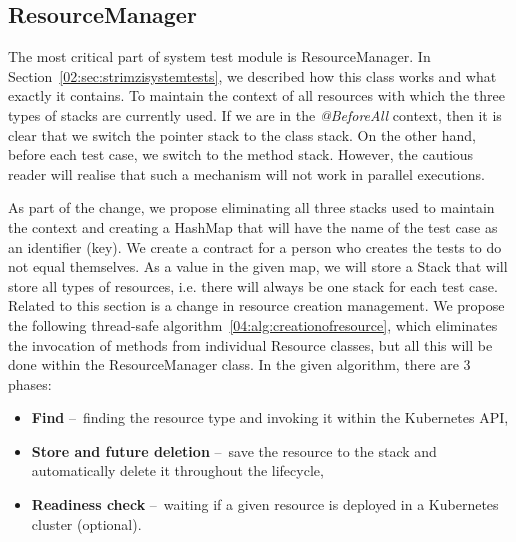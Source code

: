 \subsection{ResourceManager}
\label{04:sub:sec:resourcemanager}

The most critical part of system test module is ResourceManager.
In Section~\ref{02:sec:strimzisystemtests}, we described how this class works and what exactly it contains.
To maintain the context of all resources with which the three types of stacks are currently used.
If we are in the \emph{@BeforeAll} context, then it is clear that we switch the pointer stack to the class stack.
On the other hand, before each test case, we switch to the method stack.
However, the cautious reader will realise that such a mechanism will not work in parallel executions.

As part of the change, we propose eliminating all three stacks used to maintain the context and creating a HashMap that will have the name of the test case as an identifier (key).
We create a contract for a person who creates the tests to do not equal themselves.
As a value in the given map, we will store a Stack that will store all types of resources, i.e. there will always be one stack for each test case.
Related to this section is a change in resource creation management.
We propose the following thread-safe algorithm~\ref{04:alg:creationofresource}, which eliminates the invocation of methods from individual Resource classes, but all this will be done within the ResourceManager class.
In the given algorithm, there are 3 phases:

\begin{itemize}[itemsep=1mm, parsep=0pt]
    \item \textbf{Find} \---\ finding the resource type and invoking it within the Kubernetes API,
    \item \textbf {Store and future deletion} \---\ save the resource to the stack and automatically delete it throughout the lifecycle,
    \item \textbf {Readiness check} \---\ waiting if a given resource is deployed in a Kubernetes cluster (optional).
\end{itemize}

